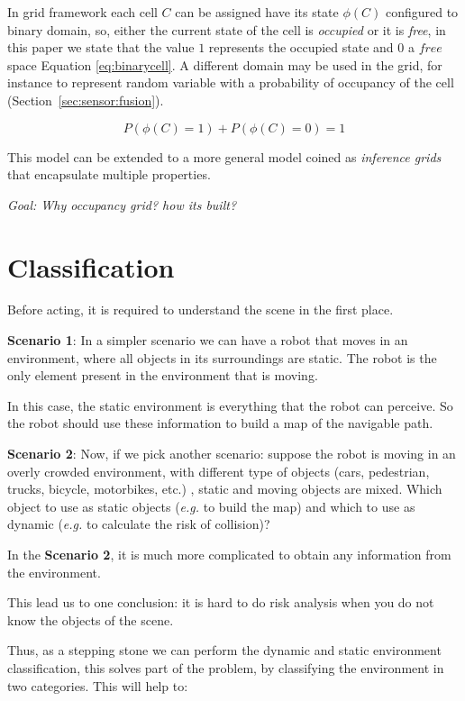 In grid framework each cell $C$ can be assigned have its state $\phi(C)$ configured to binary domain, so, either the current state of the cell is \textit{occupied} or it is \textit{free}, in this paper we state that the value $1$ represents the occupied state and $0$ a $free$ space Equation \ref{eq:binarycell}. A different domain may be used in the grid, for instance to represent random variable with a probability of occupancy of the cell (Section~\ref{sec:sensor:fusion}).

\begin{equation}
P(\phi(C)=1) + P(\phi(C)=0) = 1
\label{eq:binarycell}
\end{equation}

This model can be extended to a more general model coined as \textit{inference grids} that encapsulate multiple properties\cite{Elfes:1989:OGP:916528}.

\textit{Goal: Why occupancy grid? how its built? }

\section{Classification}

Before acting, it is required to understand the scene in the first place.

\textbf{Scenario 1}: In a simpler scenario we can have a robot that moves in an environment, where all objects in its surroundings are static. The robot is the only element present in the environment that is moving.

In this case, the static environment is everything that the robot can perceive. So the robot should use these information to build a map of the navigable path.

\textbf{Scenario 2}: Now, if we pick another scenario: suppose the robot is moving in an overly crowded environment, with different type of objects (cars, pedestrian, trucks, bicycle, motorbikes, etc.) , static and moving objects are mixed. Which object to use as static objects (\textit{e.g.} to build the map) and which to use as dynamic (\textit{e.g.} to calculate the risk of collision)? 

In the \textbf{Scenario 2}, it is much more complicated to obtain any information from the environment.

This lead us to one conclusion: it is hard to do risk analysis when you do not know the objects of the scene.

Thus, as a stepping stone we can perform the dynamic and static environment classification, this solves part of the problem, by classifying the environment in two categories. This will help to:

